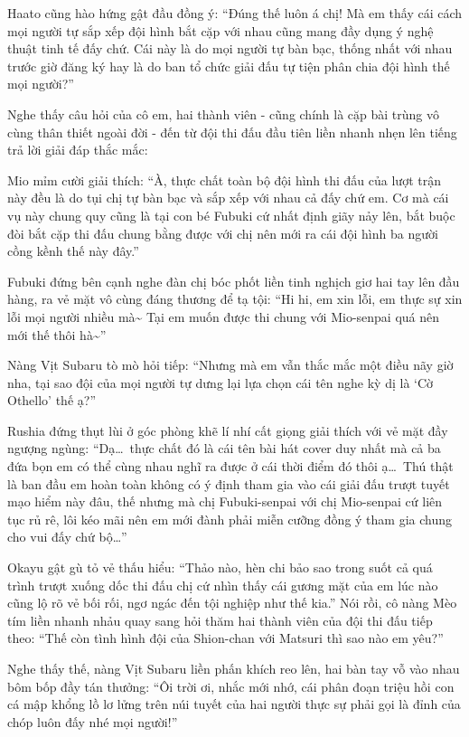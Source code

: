 \documentclass[../main.tex]{subfiles}
\begin{document}
Haato cũng hào hứng gật đầu đồng ý: ``Đúng thế luôn á chị! Mà em thấy cái cách mọi người tự sắp xếp đội hình bắt cặp với nhau cũng mang đầy dụng ý nghệ thuật tinh tế đấy chứ. Cái này là do mọi người tự bàn bạc, thống nhất với nhau trước giờ đăng ký hay là do ban tổ chức giải đấu tự tiện phân chia đội hình thế mọi người?''

Nghe thấy câu hỏi của cô em, hai thành viên - cũng chính là cặp bài trùng vô cùng thân thiết ngoài đời - đến từ đội thi đấu đầu tiên liền nhanh nhẹn lên tiếng trả lời giải đáp thắc mắc:

Mio mỉm cười giải thích: ``À, thực chất toàn bộ đội hình thi đấu của lượt trận này đều là do tụi chị tự bàn bạc và sắp xếp với nhau cả đấy chứ em. Cơ mà cái vụ này chung quy cũng là tại con bé Fubuki cứ nhất định giãy nảy lên, bắt buộc đòi bắt cặp thi đấu chung bằng được với chị nên mới ra cái đội hình ba người cồng kềnh thế này đây.''

Fubuki đứng bên cạnh nghe đàn chị bóc phốt liền tinh nghịch giơ hai tay lên đầu hàng, ra vẻ mặt vô cùng đáng thương để tạ tội: ``Hi hi, em xin lỗi, em thực sự xin lỗi mọi người nhiều mà\~{} Tại em muốn được thi chung với Mio-senpai quá nên mới thế thôi hà\~{}''

Nàng Vịt Subaru tò mò hỏi tiếp: ``Nhưng mà em vẫn thắc mắc một điều nãy giờ nha, tại sao đội của mọi người tự dưng lại lựa chọn cái tên nghe kỳ dị là `Cờ Othello' thế ạ?''

Rushia đứng thụt lùi ở góc phòng khẽ lí nhí cất giọng giải thích với vẻ mặt đầy ngượng ngùng: ``Dạ\dots\ thực chất đó là cái tên bài hát cover duy nhất mà cả ba đứa bọn em có thể cùng nhau nghĩ ra được ở cái thời điểm đó thôi ạ\dots\ Thú thật là ban đầu em hoàn toàn không có ý định tham gia vào cái giải đấu trượt tuyết mạo hiểm này đâu, thế nhưng mà chị Fubuki-senpai với chị Mio-senpai cứ liên tục rủ rê, lôi kéo mãi nên em mới đành phải miễn cưỡng đồng ý tham gia chung cho vui đấy chứ bộ\dots''

Okayu gật gù tỏ vẻ thấu hiểu: ``Thảo nào, hèn chi bảo sao trong suốt cả quá trình trượt xuống dốc thi đấu chị cứ nhìn thấy cái gương mặt của em lúc nào cũng lộ rõ vẻ bối rối, ngơ ngác đến tội nghiệp như thế kia.'' Nói rồi, cô nàng Mèo tím liền nhanh nhảu quay sang hỏi thăm hai thành viên của đội thi đấu tiếp theo: ``Thế còn tình hình đội của Shion-chan với Matsuri thì sao nào em yêu?''

Nghe thấy thế, nàng Vịt Subaru liền phấn khích reo lên, hai bàn tay vỗ vào nhau bôm bốp đầy tán thưởng: ``Ôi trời ơi, nhắc mới nhớ, cái phân đoạn triệu hồi con cá mập khổng lồ lơ lửng trên núi tuyết của hai người thực sự phải gọi là đỉnh của chóp luôn đấy nhé mọi người!''
\end{document}
